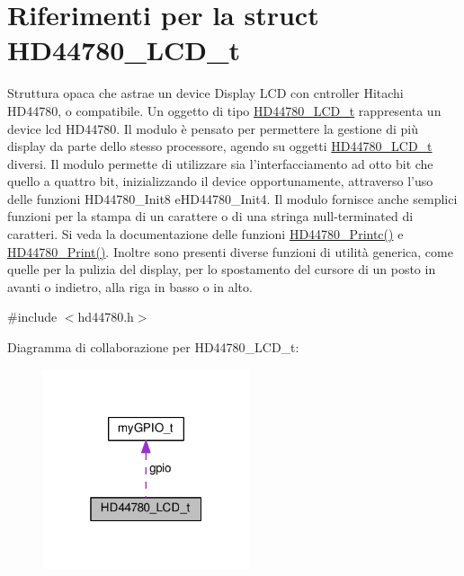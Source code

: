 \hypertarget{struct_h_d44780___l_c_d__t}{\section{Riferimenti per la struct H\+D44780\+\_\+\+L\+C\+D\+\_\+t}
\label{struct_h_d44780___l_c_d__t}
}


Struttura opaca che astrae un device Display L\+C\+D con cntroller Hitachi H\+D44780, o compatibile. Un oggetto di tipo \hyperlink{struct_h_d44780___l_c_d__t}{H\+D44780\+\_\+\+L\+C\+D\+\_\+t} rappresenta un device lcd H\+D44780. Il modulo è pensato per permettere la gestione di più display da parte dello stesso processore, agendo su oggetti \hyperlink{struct_h_d44780___l_c_d__t}{H\+D44780\+\_\+\+L\+C\+D\+\_\+t} diversi. Il modulo permette di utilizzare sia l'interfacciamento ad otto bit che quello a quattro bit, inizializzando il device opportunamente, attraverso l'uso delle funzioni H\+D44780\+\_\+\+Init8 e\+H\+D44780\+\_\+\+Init4. Il modulo fornisce anche semplici funzioni per la stampa di un carattere o di una stringa null-\/terminated di caratteri. Si veda la documentazione delle funzioni \hyperlink{group___h_d44780_ga57b8c6ca0b3c12e5f7273b3c373a6f17}{H\+D44780\+\_\+\+Printc()} e \hyperlink{group___h_d44780_ga3aedff8e2040e62db569fde955d3987b}{H\+D44780\+\_\+\+Print()}. Inoltre sono presenti diverse funzioni di utilità generica, come quelle per la pulizia del display, per lo spostamento del cursore di un posto in avanti o indietro, alla riga in basso o in alto.  




{\ttfamily \#include $<$hd44780.\+h$>$}



Diagramma di collaborazione per H\+D44780\+\_\+\+L\+C\+D\+\_\+t\+:\nopagebreak
\begin{figure}[H]
\begin{center}
\leavevmode
\includegraphics[width=172pt]{struct_h_d44780___l_c_d__t__coll__graph}
\end{center}
\end{figure}
